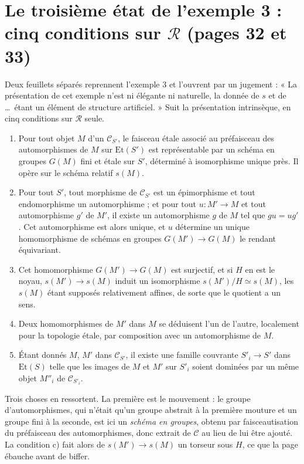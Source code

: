 \documentclass[11pt,a4paper]{article}
\begin{document}
\section*{Le troisième état de l'exemple 3 : cinq conditions sur $\mathcal{R}$ (pages 32 et 33)}

Deux feuillets séparés reprennent l'exemple 3 et l'ouvrent par un jugement :
« La présentation de cet exemple n'est ni élégante ni naturelle, la donnée de
$s$ et de …\ étant un élément de structure artificiel. » Suit la
présentation intrinsèque, en cinq conditions sur $\mathcal{R}$ seule.

\begin{enumerate}
  \item[a)] Pour tout objet $M$ d'un $\mathcal{C}_{S'}$, le faisceau étale
    associé au préfaisceau des automorphismes de $M$ sur $\mathrm{Et}(S')$ est
    représentable par un schéma en groupes $G(M)$ fini et étale sur $S'$,
    déterminé à isomorphisme unique près. Il opère sur le schéma relatif
    $s(M)$.
  \item[b)] Pour tout $S'$, tout morphisme de $\mathcal{C}_{S'}$ est un
    épimorphisme et tout endomorphisme un automorphisme ; et pour tout
    $u : M' \to M$ et tout automorphisme $g'$ de $M'$, il existe un
    automorphisme $g$ de $M$ tel que $gu = ug'$. Cet automorphisme est alors
    unique, et $u$ détermine un unique homomorphisme de schémas en groupes
    $G(M') \to G(M)$ le rendant équivariant.
  \item[c)] Cet homomorphisme $G(M') \to G(M)$ est surjectif, et si $H$ en est
    le noyau, $s(M') \to s(M)$ induit un isomorphisme $s(M')/H \simeq s(M)$,
    les $s(M)$ étant supposés relativement affines, de sorte que le quotient a
    un sens.
  \item[d)] Deux homomorphismes de $M'$ dans $M$ se déduisent l'un de l'autre,
    localement pour la topologie étale, par composition avec un automorphisme
    de $M$.
  \item[e)] Étant donnés $M$, $M'$ dans $\mathcal{C}_{S'}$, il existe une
    famille couvrante $S'_{i} \to S'$ dans $\mathrm{Et}(S)$ telle que les
    images de $M$ et $M'$ sur $S'_{i}$ soient dominées par un même objet
    $M''_{i}$ de $\mathcal{C}_{S'_{i}}$.
\end{enumerate}

Trois choses en ressortent. La première est le mouvement : le groupe
d'automorphismes, qui n'était qu'un groupe abstrait à la première mouture et un
groupe fini à la seconde, est ici un \emph{schéma en groupes}, obtenu par
faisceautisation du préfaisceau des automorphismes, donc extrait de
$\mathcal{C}$ au lieu de lui être ajouté. La condition c) fait alors de $s(M') \to
s(M)$ un torseur sous $H$, ce que la page ébauche avant de biffer.
\end{document}
